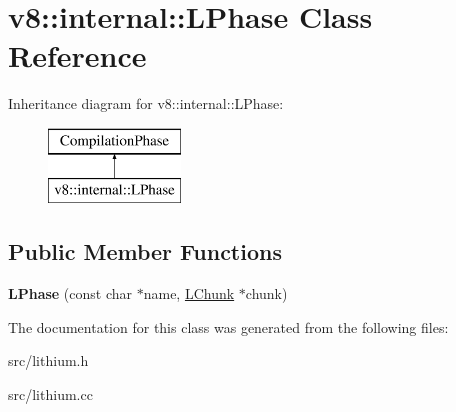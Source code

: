 \hypertarget{classv8_1_1internal_1_1_l_phase}{}\section{v8\+:\+:internal\+:\+:L\+Phase Class Reference}
\label{classv8_1_1internal_1_1_l_phase}
Inheritance diagram for v8\+:\+:internal\+:\+:L\+Phase\+:\begin{figure}[H]
\begin{center}
\leavevmode
\includegraphics[height=2.000000cm]{classv8_1_1internal_1_1_l_phase}
\end{center}
\end{figure}
\subsection*{Public Member Functions}
\begin{DoxyCompactItemize}
\item 
\hypertarget{classv8_1_1internal_1_1_l_phase_a70718adf2b978bb0bfc107856fa0f5f2}{}{\bfseries L\+Phase} (const char $\ast$name, \hyperlink{classv8_1_1internal_1_1_l_chunk}{L\+Chunk} $\ast$chunk)\label{classv8_1_1internal_1_1_l_phase_a70718adf2b978bb0bfc107856fa0f5f2}

\end{DoxyCompactItemize}


The documentation for this class was generated from the following files\+:\begin{DoxyCompactItemize}
\item 
src/lithium.\+h\item 
src/lithium.\+cc\end{DoxyCompactItemize}
